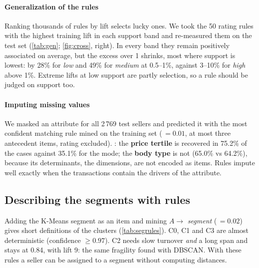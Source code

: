\paragraph{Generalization of the rules} Ranking thousands of rules by lift selects lucky ones. We took the 50 rating rules with the highest training lift in each support band and re-measured them on the test set (\cref{tab:gen}; \cref{fig:cross}, right). In every band they remain positively associated on average, but the excess over 1 shrinks, most where support is lowest: by 28\% for \emph{low} and 49\% for \emph{medium} at 0.5--1\%, against 3--10\% for \emph{high} above 1\%. Extreme lifts at low support are partly selection, so a rule should be judged on support too.

\begin{table}[t]
\centering
\caption{Mean lift of the 50 best rating rules per support band, training $\to$ test.}\label{tab:gen}
\end{table}

\paragraph{Imputing missing values} We masked an attribute for all 2\,769 test sellers and predicted it with the most confident matching rule mined on the training set ($\,=0.01$, at most three antecedent items, rating excluded). : the \textbf{price tertile} is recovered in 75.2\% of the cases against 35.1\% for the mode; the \textbf{body type} is not (65.0\% vs 64.2\%), because its determinants, the dimensions, are not encoded as items. Rules impute well exactly when the transactions contain the drivers of the attribute.

\begin{table}[t]
\centering
\caption{Rule-based imputation of masked test values.}\label{tab:imp}
\end{table}

\subsection{Describing the segments with rules}\label{sec:segrules}
Adding the K-Means segment as an item and mining $A\to$ \emph{segment} ($\,=0.02$) gives short definitions of the clusters (\cref{tab:segrules}). C0, C1 and C3 are almost deterministic (confidence $\geq0.97$). C2 needs slow turnover \emph{and} a long span and stays at 0.84, with lift 9: the same fragility found with DBSCAN. With these rules a seller can be assigned to a segment without computing distances.

\begin{table}[t]
\centering
\caption{Two most confident non-redundant rules per K-Means segment.}\label{tab:segrules}
\end{table}
